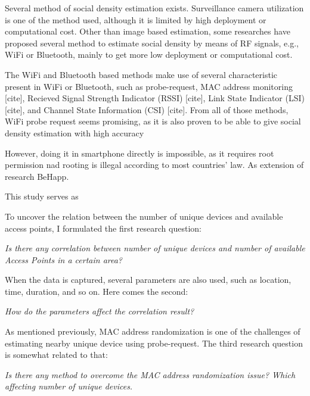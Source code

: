 Several method of social density estimation exists. Surveillance camera utilization is one of the method used, although it is limited by high deployment or computational cost. Other than image based estimation, some researches have proposed several method to estimate social density by means of RF signals, e.g., WiFi or Bluetooth, mainly to get more low deployment or computational cost.

The WiFi and Bluetooth based methods make use of several characteristic present in WiFi or Bluetooth, such as probe-request, MAC address monitoring [cite], Recieved Signal Strength Indicator (RSSI) [cite], Link State Indicator (LSI) [cite], and Channel State Information (CSI) [cite]. From all of those methods, WiFi probe request seems promising, as it is also proven to be able to give social density estimation with high accuracy~\cite{}

However, doing it in smartphone directly is impossible, as it requires root permission nad rooting is illegal according to most countries' law. As extension of research BeHapp.


This study serves as 

To uncover the relation between the number of unique devices and available access points, I formulated the first research question:
\begin{displayquote}\textit{
Is there any correlation between number of unique devices and number of available Access Points in a certain area?}
\end{displayquote}

When the data is captured, several parameters are also used, such as location, time, duration, and so on. Here comes the second:
\begin{displayquote}\textit{
How do the parameters affect the correlation result?}
\end{displayquote}

As mentioned previously, MAC address randomization is one of the challenges of estimating nearby unique device using probe-request. The third research question is somewhat related to that:
\begin{displayquote}\textit{
Is there any method to overcome the MAC address randomization issue? Which affecting number of unique devices.}
\end{displayquote}

